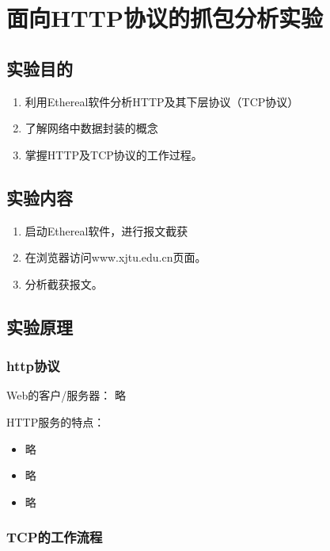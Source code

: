 \documentclass{article}
\begin{document}
\newpage

\section{面向HTTP协议的抓包分析实验}


\subsection{实验目的}

\begin{enumerate}[(1)]
    \item 利用Ethereal软件分析HTTP及其下层协议（TCP协议）
    \item 了解网络中数据封装的概念
    \item  掌握HTTP及TCP协议的工作过程。 
\end{enumerate}

\subsection{实验内容}
\begin{enumerate}[(1)]
    \item 启动Ethereal软件，进行报文截获
    \item 在浏览器访问www.xjtu.edu.cn页面。
    \item 分析截获报文。
\end{enumerate}

\subsection{实验原理}
\subsubsection{http协议}

Web的客户/服务器：
略

HTTP服务的特点：

\begin{itemize}
    \item 略
    \item 略
    \item 略
\end{itemize}

\subsubsection{TCP的工作流程}
\end{document}
